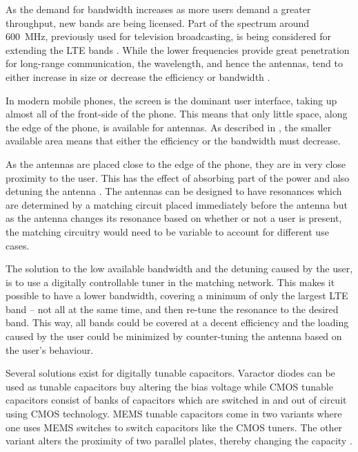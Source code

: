As the demand for bandwidth increases as more users demand a greater throughput, new bands are being licensed. Part of the spectrum around \SI{600}{MHz}, previously used for television broadcasting, is being considered for extending the LTE bands \cite{Samantha2015tunableAntennas}. While the lower frequencies provide great penetration for long-range communication, the wavelength, and hence the antennas, tend to either increase in size or decrease the efficiency or bandwidth \cite{hilbert2015tradeoff}. 

In modern mobile phones, the screen is the dominant user interface, taking up almost all of the front-side of the phone. This means that only little space, along the edge of the phone, is available for antennas. As described in \cite{hilbert2015tradeoff}, the smaller available area means that either the efficiency or the bandwidth must decrease.

As the antennas are placed close to the edge of the phone, they are in very close proximity to the user. This has the effect of absorbing part of the power and also detuning the antenna \cite{pelosi2009grip}. The antennas can be designed to have resonances which are determined by a matching circuit placed immediately before the antenna but as the antenna changes its resonance based on whether or not a user is present, the matching circuitry would need to be variable to account for different use cases.

The solution to the low available bandwidth and the detuning caused by the user, is to use a digitally controllable tuner in the matching network. This makes it possible to have a lower bandwidth, covering a minimum of only the largest LTE band -- not all at the same time, and then re-tune the resonance to the desired band. This way, all bands could be covered at a decent efficiency and the loading caused by the user could be minimized by counter-tuning the antenna based on the user's behaviour.

Several solutions exist for digitally tunable capacitors. Varactor diodes can be used as tunable capacitors buy altering the bias voltage while CMOS tunable capacitors consist of banks of capacitors which are switched in and out of circuit using CMOS technology. MEMS tunable capacitors come in two variants where one uses MEMS switches to switch capacitors like the CMOS tuners. The other variant alters the proximity of two parallel plates, thereby changing the capacity \cite{gu2014rf}.

